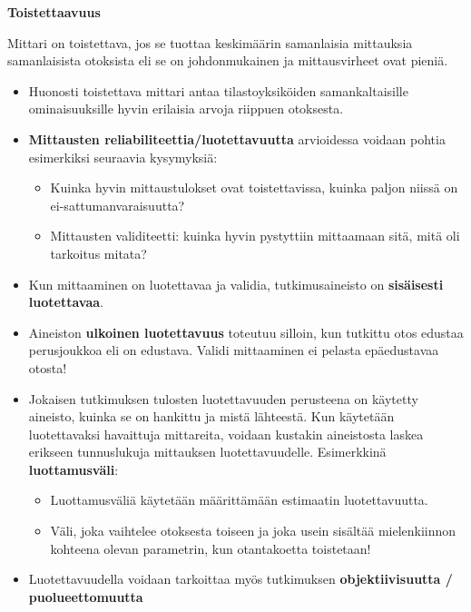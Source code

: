 \documentclass[
]{book}
\providecommand{\tightlist}{%
  \setlength{\itemsep}{0pt}\setlength{\parskip}{0pt}}
\begin{document}
\begin{noteblock}{}
\textbf{Toistettaavuus}

Mittari on toistettava, jos se tuottaa keskimäärin samanlaisia mittauksia samanlaisista otoksista eli se on johdonmukainen ja mittausvirheet ovat pieniä.

\end{noteblock}

\begin{itemize}
\item
  Huonosti toistettava mittari antaa tilastoyksiköiden samankaltaisille ominaisuuksille hyvin erilaisia arvoja riippuen otoksesta.
\item
  \textbf{Mittausten reliabiliteettia/luotettavuutta} arvioidessa voidaan pohtia esimerkiksi seuraavia kysymyksiä:

  \begin{itemize}
  \tightlist
  \item
    Kuinka hyvin mittaustulokset ovat toistettavissa, kuinka paljon niissä on ei-sattumanvaraisuutta?
  \item
    Mittausten validiteetti: kuinka hyvin pystyttiin mittaamaan sitä, mitä oli tarkoitus mitata?
  \end{itemize}
\item
  Kun mittaaminen on luotettavaa ja validia, tutkimusaineisto on \textbf{sisäisesti luotettavaa}.
\item
  Aineiston \textbf{ulkoinen luotettavuus} toteutuu silloin, kun tutkittu otos edustaa perusjoukkoa eli on edustava. Validi mittaaminen ei pelasta epäedustavaa otosta!
\item
  Jokaisen tutkimuksen tulosten luotettavuuden perusteena on käytetty aineisto, kuinka se on hankittu ja mistä lähteestä. Kun käytetään luotettavaksi havaittuja mittareita, voidaan kustakin aineistosta laskea erikseen tunnuslukuja mittauksen luotettavuudelle. Esimerkkinä \textbf{luottamusväli}:

  \begin{itemize}
  \tightlist
  \item
    Luottamusväliä käytetään määrittämään estimaatin luotettavuutta.
  \item
    Väli, joka vaihtelee otoksesta toiseen ja joka usein sisältää mielenkiinnon kohteena olevan parametrin, kun otantakoetta toistetaan!
  \end{itemize}
\item
  Luotettavuudella voidaan tarkoittaa myös tutkimuksen \textbf{objektiivisuutta / puolueettomuutta}


\end{itemize}
\end{document}
